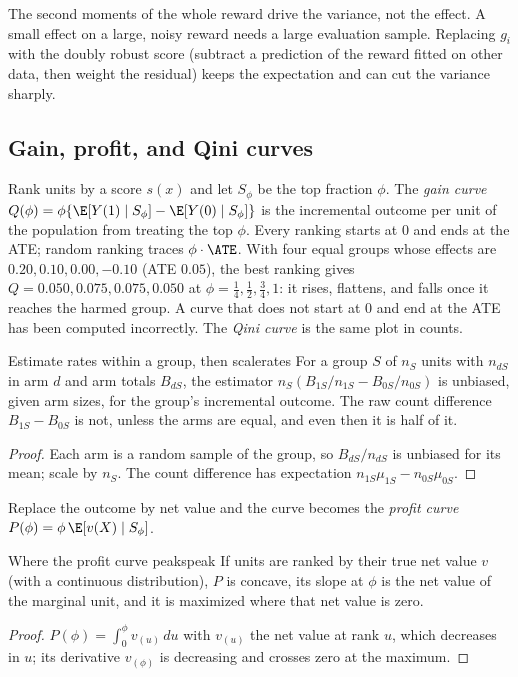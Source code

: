 \documentclass[11pt]{article}
\begin{document}
The second moments of the whole reward drive the variance, not the effect. A small effect on a large, noisy reward
needs a large evaluation sample. Replacing $g_i$ with the doubly robust score (subtract a prediction
of the reward fitted on other data, then weight the residual) keeps the expectation and can cut the variance
sharply.

\subsection{Gain, profit, and Qini curves}

Rank units by a score $s(x)$ and let $S_\phi$ be the top fraction $\phi$. The \emph{gain curve}
$Q(\phi) = \phi\{\E[Y(1) \mid S_\phi] - \E[Y(0) \mid S_\phi]\}$ is the incremental outcome per unit of the population from
treating the top $\phi$. Every ranking starts at $0$ and ends at the ATE; random ranking traces $\phi\cdot\ATE$. With
four equal groups whose effects are $0.20, 0.10, 0.00, -0.10$ (ATE $0.05$), the best ranking gives $Q = 0.050, 0.075, 0.075,
0.050$ at $\phi = \tfrac14, \tfrac12, \tfrac34, 1$: it rises, flattens, and falls once it reaches the harmed group. A curve
that does not start at $0$ and end at the ATE has been computed incorrectly. The \emph{Qini curve} is the same plot in counts.

\begin{prop}{Estimate rates within a group, then scale}{rates}
For a group $S$ of $n_S$ units with $n_{dS}$ in arm $d$ and arm totals $B_{dS}$, the estimator
$n_S(B_{1S}/n_{1S} - B_{0S}/n_{0S})$ is unbiased, given arm sizes, for the group's incremental outcome. The raw count
difference $B_{1S} - B_{0S}$ is not, unless the arms are equal, and even then it is half of it.
\end{prop}
\begin{proof}
Each arm is a random sample of the group, so $B_{dS}/n_{dS}$ is unbiased for its mean; scale by $n_S$. The count
difference has expectation $n_{1S}\mu_{1S} - n_{0S}\mu_{0S}$.
\end{proof}

Replace the outcome by net value and the curve becomes the \emph{profit curve} $P(\phi) = \phi\,\E[v(X) \mid S_\phi]$.

\begin{prop}{Where the profit curve peaks}{peak}
If units are ranked by their true net value $v$ (with a continuous distribution), $P$ is concave, its slope at $\phi$
is the net value of the marginal unit, and it is maximized where that net value is zero.
\end{prop}
\begin{proof}
$P(\phi) = \int_0^\phi v_{(u)}\,du$ with $v_{(u)}$ the net value at rank $u$, which decreases in $u$; its derivative
$v_{(\phi)}$ is decreasing and crosses zero at the maximum.
\end{proof}
\end{document}
